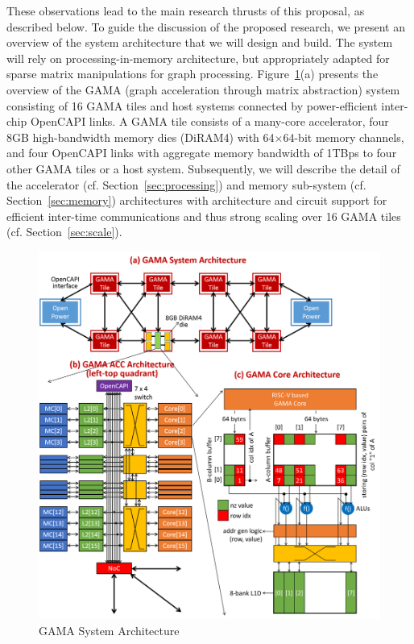 These observations lead to the main research thrusts of this proposal, as described below. 
To guide the discussion of the proposed research, we present an overview of the system architecture that we will design and build. 
The system will rely on processing-in-memory architecture, but appropriately adapted for sparse matrix manipulations for graph processing. 
Figure~\ref{fig:arch}(a) presents the overview of the GAMA (graph acceleration through matrix abstraction) system consisting of 16 GAMA tiles and host systems connected by power-efficient inter-chip OpenCAPI links.
A GAMA tile consists of a many-core accelerator, four 8GB high-bandwidth memory dies (DiRAM4) with 64$\times$64-bit memory channels, 
and four OpenCAPI links with aggregate memory bandwidth of 1TBps to four other GAMA tiles or a host system.
Subsequently, we will describe the detail of the accelerator (cf. Section~\ref{sec:processing}) and memory sub-system (cf. Section~\ref{sec:memory}) architectures with architecture and circuit support for efficient inter-time communications and thus strong scaling over 16 GAMA tiles (cf. Section~\ref{sec:scale}).


\begin{figure}
\center
\includegraphics[width=1.0\linewidth]{fig/arch.png}
\caption{GAMA System Architecture}
\label{fig:arch}
\end{figure}


